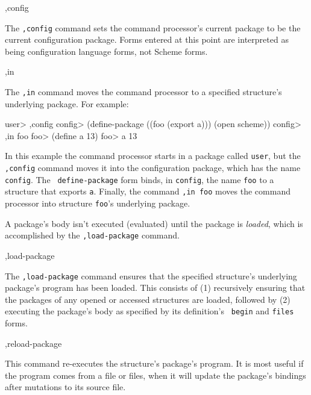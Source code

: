 \begin{list}{}{}{}

\item
\begin{code}
,config
\end{code}
    The {\tt,config} command sets the command processor's current package
    to be the current configuration package.  Forms entered at this point are
    interpreted as being configuration language forms, not Scheme forms.

\item
\begin{code}
,in 
\end{code}
    The {\tt ,in} command moves the command processor to a specified
    structure's underlying package.  For example:
\begin{code}
    user> ,config
    config> (define-package ((foo (export a)))
	      (open scheme))
    config> ,in foo
    foo> (define a 13)
    foo> a
    13
\end{code}
    In this example the command processor starts in a package called
    {\tt user}, but the {\tt ,config} command moves it into the
    configuration package, which has the name {\tt config}.  The {\tt
    define-package} form binds, in {\tt config}, the name {\tt foo} to
    a structure that exports {\tt a}.  Finally, the command {\tt ,in
    foo} moves the command processor into structure {\tt foo}'s
    underlying package.

    A package's body isn't executed (evaluated) until the package is
    {\em loaded}, which is accomplished by the {\tt ,load-package}
    command.

\item
\begin{code}
,load-package 
\end{code}
    The {\tt,load-package} command ensures that the specified structure's
    underlying package's program has been loaded.  This 
    consists of (1) recursively ensuring that the packages of any
    opened or accessed structures are loaded, followed by (2)
    executing the package's body as specified by its definition's {\tt
    begin} and {\tt files} forms.

\item
\begin{code}
,reload-package 
\end{code}
    This command re-executes the structure's package's program.  It
    is most useful if the program comes from a file or files, when
    it will update the package's bindings after mutations to its
    source file.


\end{list}
